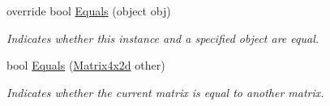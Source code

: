 \begin{DoxyCompactItemize}
override bool \hyperlink{struct_open_t_k_1_1_matrix4x2d_a41b8a34d5530786509c6da0831a81931}{Equals} (object obj)
\begin{DoxyCompactList}\small\item\em Indicates whether this instance and a specified object are equal. \end{DoxyCompactList}\item 
bool \hyperlink{struct_open_t_k_1_1_matrix4x2d_ab2abf5887ca015d6a8f9cc68f45a1934}{Equals} (\hyperlink{struct_open_t_k_1_1_matrix4x2d}{Matrix4x2d} other)
\begin{DoxyCompactList}\small\item\em Indicates whether the current matrix is equal to another matrix. \end{DoxyCompactList}\end{DoxyCompactItemize}
